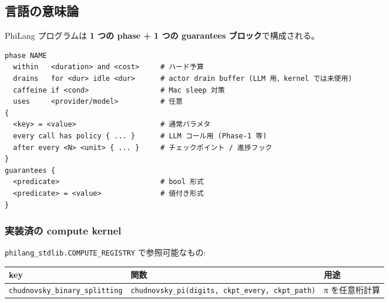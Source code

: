 \documentclass[
]{ltjsarticle}
\newcounter{none} %
\begin{document}
\subsection{言語の意味論}\label{ux8a00ux8a9eux306eux610fux5473ux8ad6}

PhiLang プログラムは \textbf{1 つの phase + 1 つの guarantees
ブロック}で構成される。

\begin{verbatim}
phase NAME
  within   <duration> and <cost>     # ハード予算
  drains   for <dur> idle <dur>      # actor drain buffer (LLM 用、kernel では未使用)
  caffeine if <cond>                 # Mac sleep 対策
  uses     <provider/model>          # 任意
{
  <key> = <value>                    # 通常パラメタ
  every call has policy { ... }      # LLM コール用 (Phase-1 等)
  after every <N> <unit> { ... }     # チェックポイント / 進捗フック
}
guarantees {
  <predicate>                        # bool 形式
  <predicate> = <value>              # 値付き形式
}
\end{verbatim}

\subsubsection{実装済の compute
kernel}\label{ux5b9fux88c5ux6e08ux306e-compute-kernel}

\texttt{philang\_stdlib.COMPUTE\_REGISTRY} で参照可能なもの:

{\def\LTcaptype{none} %
\begin{longtable}[]{@{}
  >{\raggedright\arraybackslash}p{}
  >{\raggedright\arraybackslash}p{}
  >{\raggedright\arraybackslash}p{}@{}}
\toprule\noalign{}
\begin{minipage}[b]{\linewidth}\raggedright
key
\end{minipage} & \begin{minipage}[b]{\linewidth}\raggedright
関数
\end{minipage} & \begin{minipage}[b]{\linewidth}\raggedright
用途
\end{minipage} \\
\midrule\noalign{}
\endhead
\bottomrule\noalign{}
\endlastfoot
\texttt{chudnovsky\_binary\_splitting} &
\texttt{chudnovsky\_pi(digits,\ ckpt\_every,\ ckpt\_path)} & π
を任意桁計算 \\
\end{longtable}
}
\end{document}
